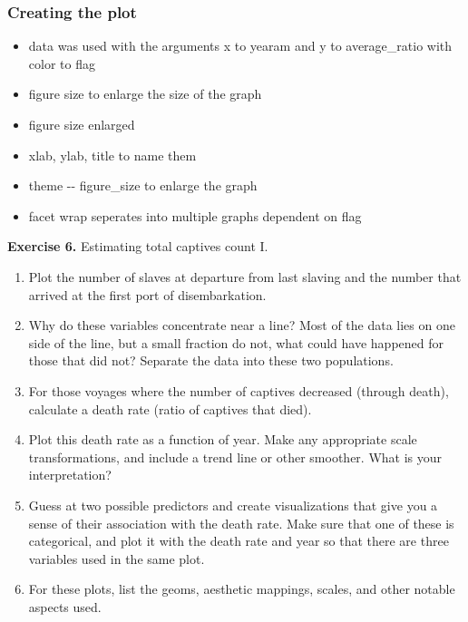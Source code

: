 \documentclass[11pt]{article}
\providecommand{\tightlist}{%
      \setlength{\itemsep}{0pt}\setlength{\parskip}{0pt}}
\begin{document}
\subsubsection{Creating the plot}\label{creating-the-plot-1}

\begin{itemize}
\tightlist
\item
  data was used with the arguments x to yearam and y to average\_ratio
  with color to flag
\item
  figure size to enlarge the size of the graph
\item
  figure size enlarged
\item
  xlab, ylab, title to name them
\item
  theme -\/- figure\_size to enlarge the graph
\item
  facet wrap seperates into multiple graphs dependent on flag
\end{itemize}

    \textbf{Exercise 6.} Estimating total captives count I.

\begin{enumerate}
\def\labelenumi{\arabic{enumi}.}
\tightlist
\item
  Plot the number of slaves at departure from last slaving and the
  number that arrived at the first port of disembarkation.\\
\item
  Why do these variables concentrate near a line? Most of the data lies
  on one side of the line, but a small fraction do not, what could have
  happened for those that did not? Separate the data into these two
  populations.
\item
  For those voyages where the number of captives decreased (through
  death), calculate a death rate (ratio of captives that died).\\
\item
  Plot this death rate as a function of year. Make any appropriate scale
  transformations, and include a trend line or other smoother. What is
  your interpretation?
\item
  Guess at two possible predictors and create visualizations that give
  you a sense of their association with the death rate. Make sure that
  one of these is categorical, and plot it with the death rate and year
  so that there are three variables used in the same plot.
\item
  For these plots, list the geoms, aesthetic mappings, scales, and other
  notable aspects used.
\end{enumerate}
\end{document}
